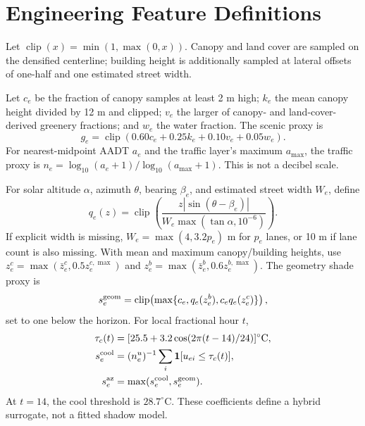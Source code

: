 \documentclass[sigconf,nonacm]{acmart}
\begin{document}
\section{Engineering Feature Definitions}\label{app:features}
Let $\operatorname{clip}(x)=\min(1,\max(0,x))$. Canopy and land cover are sampled on the densified centerline; building height is additionally sampled at lateral offsets of one-half and one estimated street width.

Let $c_e$ be the fraction of canopy samples at least 2 m high; $k_e$ the mean canopy height divided by 12 m and clipped; $v_e$ the larger of canopy- and land-cover-derived greenery fractions; and $w_e$ the water fraction. The scenic proxy is
\begin{equation}
 g_e=\operatorname{clip}(0.60c_e+0.25k_e+0.10v_e+0.05w_e).
\end{equation}
For nearest-midpoint AADT $a_e$ and the traffic layer's maximum $a_{\max}$, the traffic proxy is $n_e=\log_{10}(a_e+1)/\log_{10}(a_{\max}+1)$. This is not a decibel scale.

For solar altitude $\alpha$, azimuth $\theta$, bearing $\beta_e$, and estimated street width $W_e$, define
\begin{equation}
 q_e(z)=\operatorname{clip}\!\left(\frac{z|\sin(\theta-\beta_e)|}{W_e\max(\tan\alpha,10^{-6})}\right).
\end{equation}
If explicit width is missing, $W_e=\max(4,3.2p_e)$ m for $p_e$ lanes, or 10 m if lane count is also missing. With mean and maximum canopy/building heights, use $z_e^c=\max(\bar z_e^c,0.5z_e^{c,\max})$ and $z_e^b=\max(\bar z_e^b,0.6z_e^{b,\max})$. The geometry shade proxy is
\begin{equation}
s_e^{\rm geom}=\operatorname{clip}\!\left(\max\{c_e,q_e(z_e^b),c_eq_e(z_e^c)\}\right),
\end{equation}
set to one below the horizon. For local fractional hour $t$,
\begin{align}
 \tau_c(t)&=[25.5+3.2\cos(2\pi(t-14)/24)]^\circ\mathrm C,\\
 s_e^{\rm cool}&=(n_e^u)^{-1}\sum_i\mathbf1[u_{ei}\leq\tau_c(t)],\\
 s_e^{\rm az}&=\max(s_e^{\rm cool},s_e^{\rm geom}).
\end{align}
At $t=14$, the cool threshold is $28.7^\circ$C. These coefficients define a hybrid surrogate, not a fitted shadow model.
\end{document}
